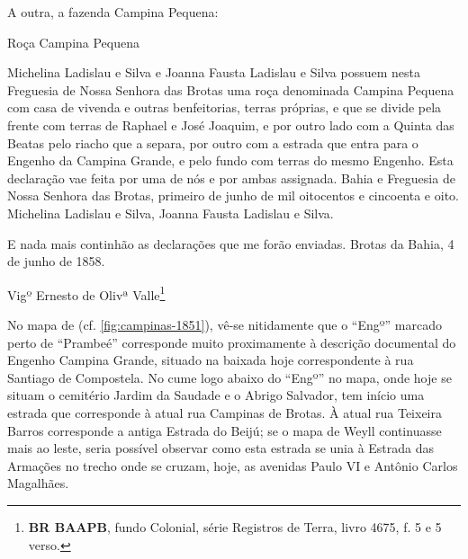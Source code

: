 A outra, a fazenda Campina Pequena:

\begin{citacao}
Roça Campina Pequena

Michelina Ladislau e Silva e Joanna Fausta Ladislau e Silva possuem nesta Freguesia de Nossa Senhora das Brotas uma roça denominada Campina Pequena com casa de vivenda e outras benfeitorias, terras próprias, e que se divide pela frente com terras de Raphael e José Joaquim, e por outro lado com a Quinta das Beatas pelo riacho que a separa, por outro com a estrada que entra para o Engenho da Campina Grande, e pelo fundo com terras do mesmo Engenho. Esta declaração vae feita por uma de nós e por ambas assignada. Bahia e Freguesia de Nossa Senhora das Brotas, primeiro de junho de mil oitocentos e cincoenta e oito. Michelina Ladislau e Silva, Joanna Fausta Ladislau e Silva.

E nada mais continhão as declarações que me forão enviadas. Brotas da Bahia, 4 de junho de 1858.

Vigº Ernesto de Olivª Valle\footnote{\textbf{BR BAAPB}, fundo Colonial, série Registros de Terra, livro 4675, f. 5 e 5 verso.}
\end{citacao}

No mapa de  (cf. \autoref{fig:campinas-1851}), vê-se nitidamente que o ``Engº'' marcado perto de ``Prambeé'' corresponde muito proximamente à descrição documental do Engenho Campina Grande, situado na baixada hoje correspondente à rua Santiago de Compostela. No cume logo abaixo do ``Engº'' no mapa, onde hoje se situam  o cemitério Jardim da Saudade e o Abrigo Salvador, tem início uma estrada que corresponde à atual rua Campinas de Brotas. À atual rua Teixeira Barros corresponde a antiga Estrada do Beijú; se o mapa de Weyll continuasse mais ao leste, seria possível observar como esta estrada se unia à Estrada das Armações no trecho onde se cruzam, hoje, as avenidas Paulo VI e Antônio Carlos Magalhães. 

